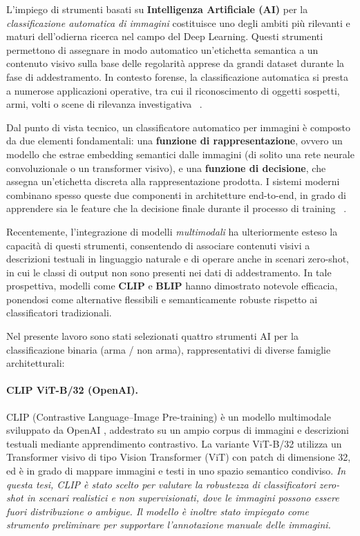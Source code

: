 L’impiego di strumenti basati su \textbf{Intelligenza Artificiale (AI)} per la \textit{classificazione automatica di immagini} costituisce uno degli ambiti più rilevanti e maturi dell’odierna ricerca nel campo del Deep Learning. Questi strumenti permettono di assegnare in modo automatico un’etichetta semantica a un contenuto visivo sulla base delle regolarità apprese da grandi dataset durante la fase di addestramento. In contesto forense, la classificazione automatica si presta a numerose applicazioni operative, tra cui il riconoscimento di oggetti sospetti, armi, volti o scene di rilevanza investigativa ~\cite{nowroozi2020adversarial, costantini2019digital}.

Dal punto di vista tecnico, un classificatore automatico per immagini è composto da due elementi fondamentali: una \textbf{funzione di rappresentazione}, ovvero un modello che estrae embedding semantici dalle immagini (di solito una rete neurale convoluzionale o un transformer visivo), e una \textbf{funzione di decisione}, che assegna un’etichetta discreta alla rappresentazione prodotta. I sistemi moderni combinano spesso queste due componenti in architetture end-to-end, in grado di apprendere sia le feature che la decisione finale durante il processo di training ~\cite{bishop2006pattern}.

Recentemente, l’integrazione di modelli \textit{multimodali} ha ulteriormente esteso la capacità di questi strumenti, consentendo di associare contenuti visivi a descrizioni testuali in linguaggio naturale e di operare anche in scenari zero-shot, in cui le classi di output non sono presenti nei dati di addestramento. In tale prospettiva, modelli come \textbf{CLIP} e \textbf{BLIP} hanno dimostrato notevole efficacia, ponendosi come alternative flessibili e semanticamente robuste rispetto ai classificatori tradizionali.

Nel presente lavoro sono stati selezionati quattro strumenti AI per la classificazione binaria (arma / non arma), rappresentativi di diverse famiglie architetturali:

\paragraph{CLIP ViT-B/32 (OpenAI).} CLIP (Contrastive Language–Image Pre-training) è un modello multimodale sviluppato da OpenAI \cite{radford2021learning}, addestrato su un ampio corpus di immagini e descrizioni testuali mediante apprendimento contrastivo. La variante ViT-B/32 utilizza un Transformer visivo di tipo Vision Transformer (ViT) \cite{dosovitskiy2020image} con patch di dimensione 32, ed è in grado di mappare immagini e testi in uno spazio semantico condiviso.  
\textit{In questa tesi, CLIP è stato scelto per valutare la robustezza di classificatori zero-shot in scenari realistici e non supervisionati, dove le immagini possono essere fuori distribuzione o ambigue. Il modello è inoltre stato impiegato come strumento preliminare per supportare l’annotazione manuale delle immagini.}

